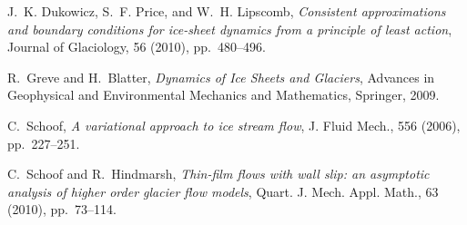 \documentclass{amsart}
\begin{document}

\begin{thebibliography}{1}

{\sc J.~K. Dukowicz, S.~F. Price, and W.~H. Lipscomb}, {\em Consistent
  approximations and boundary conditions for ice-sheet dynamics from a
  principle of least action}, Journal of Glaciology, 56 (2010), pp.~480--496.

{\sc R.~Greve and H.~Blatter}, {\em Dynamics of {I}ce {S}heets and {G}laciers},
  Advances in Geophysical and Environmental Mechanics and Mathematics,
  Springer, 2009.

{\sc C.~Schoof}, {\em A variational approach to ice stream flow}, J. Fluid
  Mech., 556 (2006), pp.~227--251.

{\sc C.~Schoof and R.~Hindmarsh}, {\em Thin-film flows with wall slip: an
  asymptotic analysis of higher order glacier flow models}, Quart. J. Mech.
  Appl. Math., 63 (2010), pp.~73--114.

\end{thebibliography}

% 
% 
\end{document}
